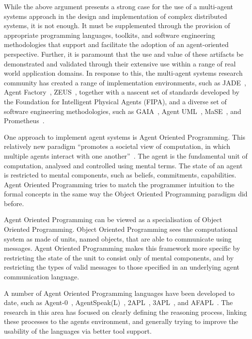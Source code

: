\documentclass[a4paper,12pt,oneside,fleqn]{book} %
\begin{document}
While the above argument presents a strong case for the use of a multi-agent
systems approach in the design and implementation of complex distributed
systems, it is not enough. It must be supplemented through the provision of
appropriate programming languages, toolkits, and software engineering
methodologies that support and facilitate the adoption of an agent-oriented
perspective. Further, it is paramount that the use and value of these artifacts
be demonstrated and validated through their extensive use within a range of
real world application domains. In response to this, the multi-agent systems
research community has created a range of implementation environments, such as
JADE~\cite{DBLP:books/sp/map2005/BellifemineBCP05}, Agent
Factory~\cite{collier1999agent}, ZEUS~\cite{DBLP:conf/agents/NwanaNLC99},
together with a nascent set of standards developed by the Foundation for
Intelligent Physical Agents (FIPA), and a diverse set of software engineering
methodologies, such as GAIA~\cite{DBLP:journals/aamas/WooldridgeJK00}, Agent
UML~\cite{bauer2001agent}, MaSE~\cite{deloach2001analysis}, and
Prometheus~\cite{DBLP:conf/atal/PadghamW02}.

One approach to implement agent systems is Agent Oriented Programming.
This relatively new paradigm ``promotes a societal view of computation, in
which multiple agents interact with one
another''~\cite{DBLP:journals/ai/Shoham93}.  The agent is the fundamental
unit of computation, analysed and controlled using mental terms.  The state
of an agent is restricted to mental components, such as beliefs,
commitments, capabilities. Agent Oriented Programming tries to match the
programmer intuition to the formal concepts in the same way the Object
Oriented Programming paradigm did before.

Agent Oriented Programming can be viewed as a specialisation of Object
Oriented Programming\null. Object Oriented Programming sees the
computational system as made of units, named objects, that are able to
communicate using messages. Agent Oriented Programming makes this framework
more specific by restricting the state of the unit to consist only of
mental components, and by restricting the types of valid messages to those
specified in an underlying agent communication language.

A number of Agent Oriented Programming languages have been developed to
date, such as Agent-0~\cite{DBLP:journals/ai/Shoham93},
AgentSpeak(L)~\cite{DBLP:conf/maamaw/Rao96},
2APL~\cite{DBLP:journals/aamas/Dastani08},
3APL~\cite{DBLP:conf/promas/DastaniRDM03}, and
AFAPL~\cite{DBLP:conf/seke/CollierOR04}. The research in this area has
focused on clearly defining the reasoning process, linking these processes
to the agents environment, and generally trying to improve the usability of
the languages via better tool support.
\end{document}

